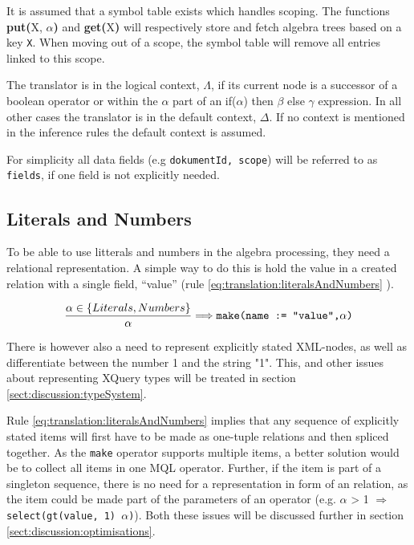 It is assumed that a symbol table exists which handles scoping. The functions
\textbf{put(}\textsf{X}, $\alpha$\textbf{)} and \textbf{get(}\textsf{X}\textbf{)}
will respectively store and fetch algebra trees based on a key \verb!X!. When
moving out of a scope, the symbol table will remove all entries linked to this scope.

The translator is in the logical context, $\Lambda$, if its current node is a
successor of a boolean operator or within the $\alpha$ part of an
\textsf{if($\alpha$) then $\beta$ else $\gamma$} expression. In all other cases
the translator is in the default context, $\Delta$. If no context is mentioned
in the inference rules the default context is assumed.

For simplicity all data fields (e.g \texttt{dokumentId, scope}) will be
referred to as \verb!fields!, if one field is not explicitly needed.

\subsection{Literals and Numbers}
\label{sect:translation:mXr:litAndNumbers}
To be able to use litterals and numbers in the algebra processing, they need a
relational representation. A simple way to do this is hold the value in a
created relation with a single field, ``value'' (rule
\ref{eq:translation:literalsAndNumbers} ).

\begin{equation}
\centering
\frac{\alpha \in \left\{ Literals, Numbers \right\} }{\alpha}
\Longrightarrow
\texttt{make(name := "value",} \alpha \texttt{)}
\label{eq:translation:literalsAndNumbers}
\end{equation}

There is however also a need to represent explicitly stated XML-nodes, as well
as differentiate between the number \textsf{1} and the string \textsf{"1"}.
This, and other issues about representing XQuery types will be treated in
section \ref{sect:discussion:typeSystem}.

Rule \ref{eq:translation:literalsAndNumbers} implies that any sequence of
explicitly stated items will first have to be made as one-tuple relations and
then spliced together. As the \texttt{make} operator supports multiple items, a
better solution would be to collect all items in one MQL operator. Further, if
the item is part of a singleton sequence, there is no need for a representation
in form of an relation, as the item could be made part of the parameters of an
operator (e.g. $\alpha$ \textsf{> 1} $\Longrightarrow$
\texttt{select(gt(value, 1) $\alpha$)}). Both these issues will be discussed
further in section \ref{sect:discussion:optimisations}.



